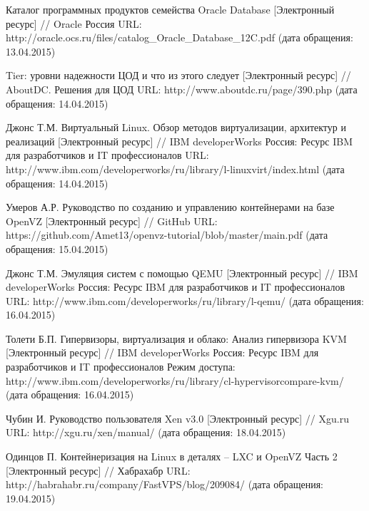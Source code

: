 \begingroup 
\renewcommand{\section}[2]{\anonsection{Библиографический список}}
\begin{thebibliography}{00}

    Каталог программных продуктов семейства Oracle Database
    [Электронный ресурс] //
    Oracle Россия
    URL: http://oracle.ocs.ru/files/catalog\_Oracle\_Database\_12C.pdf
    (дата обращения: 13.04.2015)

    Tier: уровни надежности ЦОД и что из этого следует
    [Электронный ресурс] //
    AboutDC. Решения для ЦОД
    URL: http://www.aboutdc.ru/page/390.php
    (дата обращения: 14.04.2015)

    Джонс Т.М.
    Виртуальный Linux. Обзор методов виртуализации, архитектур и реализаций
    [Электронный ресурс] //
    IBM developerWorks Россия: Ресурс IBM для разработчиков и IT профессионалов
    URL: http://www.ibm.com/developerworks/ru/library/l-linuxvirt/index.html
    (дата обращения: 14.04.2015)

    Умеров А.Р.
    Руководство по созданию и управлению контейнерами на базе OpenVZ 
    [Электронный ресурс] //
    GitHub
    URL: https://github.com/Amet13/openvz-tutorial/blob/master/main.pdf
    (дата обращения: 15.04.2015)

    Джонс Т.М.
    Эмуляция систем с помощью QEMU
    [Электронный ресурс] //
    IBM developerWorks Россия: Ресурс IBM для разработчиков и IT профессионалов
    URL: http://www.ibm.com/developerworks/ru/library/l-qemu/
    (дата обращения: 16.04.2015)

    Толети Б.П.
    Гипервизоры, виртуализация и облако: Анализ гипервизора KVM
    [Электронный ресурс] //
    IBM developerWorks Россия: Ресурс IBM для разработчиков и IT профессионалов
    Режим доступа: http://www.ibm.com/developerworks/ru/library/cl-hypervisorcompare-kvm/
    (дата обращения: 16.04.2015)

    Чубин И.
    Руководство пользователя Xen v3.0
    [Электронный ресурс] //
    Xgu.ru
    URL: http://xgu.ru/xen/manual/
    (дата обращения: 18.04.2015)

    Одинцов П.
    Контейнеризация на Linux в деталях -- LXC и OpenVZ Часть 2
    [Электронный ресурс] //
    Хабрахабр
    URL: http://habrahabr.ru/company/FastVPS/blog/209084/
    (дата обращения: 19.04.2015)


\end{thebibliography}
